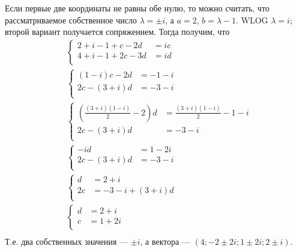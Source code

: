 \documentclass[12pt,a4paper]{article}
\begin{document}
\begin{enumproblem}
        Если первые две координаты не равны обе нулю, то можно считать, что рассматриваемое собственное число $\lambda = \pm i$, а $a = 2$, $b = \lambda - 1$. WLOG $\lambda = i$; второй вариант получается сопряжением. Тогда получим, что
        \begin{align*}
            &\left\{
                \begin{aligned}
                    2 + i - 1 + c - 2d &= i c\\
                    4 + i - 1 + 2c - 3d &= i d\\
                \end{aligned}
            \right.\\
            &\left\{
                \begin{aligned}
                    (1 - i) c - 2d &= -1 - i\\
                    2c - (3 + i)d &= -3 - i\\
                \end{aligned}
            \right.\\
            &\left\{
                \begin{aligned}
                    \left(\frac{(3 + i)(1 - i)}{2} - 2\right)d &= \frac{(3 + i)(1 - i)}{2} -1 - i\\
                    2c - (3 + i)d &= -3 - i\\
                \end{aligned}
            \right.\\
            &\left\{
                \begin{aligned}
                    -i d &= 1 - 2i\\
                    2c - (3 + i)d &= -3 - i\\
                \end{aligned}
            \right.\\
            &\left\{
                \begin{aligned}
                    d &= 2 + i\\
                    2c &= -3 - i + (3 + i)d\\
                \end{aligned}
            \right.\\
            &\left\{
                \begin{aligned}
                    d &= 2 + i\\
                    c &= 1 + 2i\\
                \end{aligned}
            \right.\\
        \end{align*}
        Т.е. два собственных значения --- $\pm i$, а вектора --- $(4; -2 \pm 2i; 1 \pm 2i; 2 \pm i)$.


\end{enumproblem}
\end{document}
